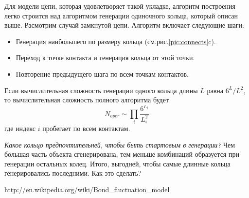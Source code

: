 \documentclass[tikz,a4paper]{scrartcl} %
\begin{document}
Для модели цепи, которая удовлетворяет такой укладке, алгоритм построения легко строится над алгоритмом генерации одиночного кольца, который описан выше. Расмотрим случай замкнутой цепи. Алгоритм включает следующие шаги:
\begin{itemize}
\item Генерация наибольшего по размеру кольца (см.рис.\ref{pic:connects}c).
\item Переход к точке контакта и генерация кольца от этой точки.
\item Повторение предыдущего шага по всем точкам контактов.
\end{itemize}
Если вычислительная сложность генерации одного кольца длины $L$ равна $6^L/L^2$, то вычислительная сложность полного алгоритма будет 
\[ N_{oper} \sim \prod_i \frac{6^{L_i}}{L_i^2} \]
где индекс $i$ пробегает по всем контактам.

\textit{Какое кольцо предпочтительней, чтобы быть стартовым в генерации?} Чем большая часть объекта сгенерирована, тем меньше комбинаций образуется при генерации остальных колец. Итого, выгодней, чтобы самые длинные кольца генерировались последними. Как это сделать?

\begin{thebibliography}{99}
 http://en.wikipedia.org/wiki/Bond\_fluctuation\_model
\end{thebibliography}
\end{document}
